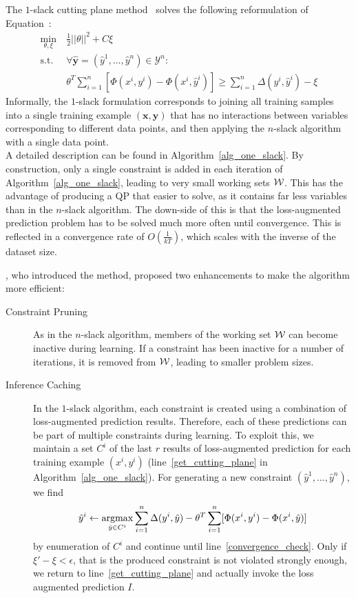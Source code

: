 The $1$-slack cutting plane method~\citep{joachims2009cutting} solves the
following reformulation of Equation~:
\begin{align}\label{eq:oneslack}
    \min_{\theta, \xi}\ &\frac{1}{2} ||\theta||^2 + C \xi\\
    \text{s.t. }&\forall \hat{\mathbf{y}}=(\hat{y}^1, \dots, \hat{y}^n) \in \mathcal{Y}^n:\\
        &\theta^T \sum_{i=1}^n [\Phi(x^i, y^i) - \Phi(x^i,
            \hat{y}^i)] \geq \sum_{i=1}^n \Delta(y^i, \hat{y}^i)
            - \xi
\end{align}
\enlargethispage{10mm}
Informally, the $1$-slack formulation corresponds to joining all training
samples into a single training example $(\mathbf{x}, \mathbf{y})$ that has no
interactions between variables corresponding to different data points, and
then applying the $n$-slack algorithm with a single data point.\pagebreak\\
A detailed description can be found in Algorithm~\ref{alg_one_slack}.
%
By construction, only a single constraint is added in each iteration of
Algorithm~\ref{alg_one_slack}, leading to very small working sets $\mathcal{W}$.
This has the advantage of producing a QP that easier to solve, as it contains far
less variables than in the $n$-slack algorithm. The down-side of this is that
the loss-augmented prediction problem has to be solved much more often until
convergence. This is reflected in a convergence rate of $O(\frac{1}{kT})$,
which scales with the inverse of the dataset size.

\citet{joachims2009cutting}, who introduced the method, proposed two enhancements
to make the algorithm more efficient:
\begin{description}
    \item[Constraint Pruning] As in the $n$-slack algorithm, members of the
        working set $\mathcal{W}$ can become inactive during learning.  If a constraint
        has been inactive for a number of iterations, it is removed from $\mathcal{W}$,
        leading to smaller problem sizes.
    \item[Inference Caching] In the $1$-slack algorithm, each constraint is
        created using a combination of loss-augmented prediction results.
        Therefore, each of these predictions can be part of multiple
        constraints during learning.
        To exploit this, we maintain a set $C^i$ of the last $r$ results of
        loss-augmented prediction for each training example $(x^i, y^i)$
        (line~\ref{get_cutting_plane} in Algorithm~\ref{alg_one_slack}).
        For generating a new constraint $(\hat{y}^1, \dotsc, \hat{y}^n)$, we
        find
        \[ \hat{y}^i \leftarrow \operatorname*{argmax}_{\hat{y}\in C^i} \sum_{i=1}^n
            \Delta(y^i, \hat{y}) - \theta^T \sum_{i=1}^n [\Phi(x^i, y^i) -
                \Phi(x^i, \hat{y})] \]
        by enumeration of $C^i$ and continue until
        line~\ref{convergence_check}.  Only if $\xi' - \xi < \epsilon$, that is
        the produced constraint is not violated strongly enough, we return to
        line~\ref{get_cutting_plane} and actually invoke the loss augmented
        prediction $I$.
\end{description}

